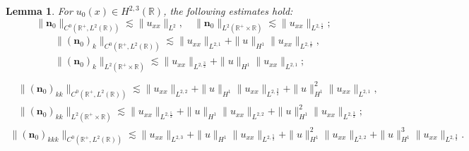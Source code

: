 \documentclass[11pt]{article}
\numberwithin{equation}{section}
\newtheorem{lemma}{Lemma}
\begin{document}
\begin{lemma}\label{lem1}
For $u_0(x) \in H^{2,3}(\mathbb{R})$, the following estimates hold:
\begin{equation}\label{n0est}
\|\textbf{n}_0\|_{C^0(\mathbb{R}^+,L^2(\mathbb{R}))}\lesssim \| u_{xx}\|_{L^{2}},\quad \| \textbf{n}_0\|_{L^2(\mathbb{R}^+\times\mathbb{R})}\lesssim \| u_{xx}\|_{L^{2,\frac{1}{2}}};
\end{equation}
\begin{equation}\label{n0exp}
\begin{aligned}
&\| (\textbf{n}_0)_k\|_{C^0(\mathbb{R}^+,L^2(\mathbb{R}))}\lesssim \| u_{xx}\|_{L^{2,1}}+\| u\|_{H^{1}}\| u_{xx}\|_{L^{2,\frac{1}{2}}},\\ &\| (\textbf{n}_0)_k\|_{L^2(\mathbb{R}^+\times\mathbb{R})}\lesssim \| u_{xx}\|_{L^{2,\frac{3}{2}}}+\| u\|_{H^{1}}\| u_{xx}\|_{L^{2,1}};\\
\end{aligned}
\end{equation}
\begin{equation}
\begin{aligned}
&\| (\textbf{n}_0)_{kk}\|_{C^0(\mathbb{R}^+,L^2(\mathbb{R}))}\lesssim \| u_{xx}\|_{L^{2,2}}+\| u\|_{H^{1}}\| u_{xx}\|_{L^{2,\frac{3}{2}}}+\| u\| ^2_{H^{1}}\| u_{xx}\|_{L^{2,1}},\\
&\| (\textbf{n}_0)_{kk}\|_{L^2(\mathbb{R}^+\times\mathbb{R})}\lesssim \| u_{xx}\|_{L^{2,\frac{5}{2}}}+\| u\|_{H^{1}}\| u_{xx}\|_{L^{2,2}}+\| u\| ^2_{H^{1}}\| u_{xx}\|_{L^{2,\frac{3}{2}}};
\end{aligned}
\end{equation}
\begin{equation}
\begin{aligned}
\|(\textbf{n}_0)_{kkk}\|_{C^0(\mathbb{R}^+,L^2(\mathbb{R}))}\lesssim\| u_{xx}\|_{L^{2,3}}+\| u\|_{H^{1}}\| u_{xx}\|_{L^{2,\frac{5}{2}}}+\| u\|^2_{H^{1}}\|u_{xx}\|_{L^{2,2}}+\| u\| ^3_{H^{1}}\| u_{xx}\|_{L^{2,\frac{3}{2}}}.\\
\end{aligned}
\end{equation}
\end{lemma}
\end{document}
